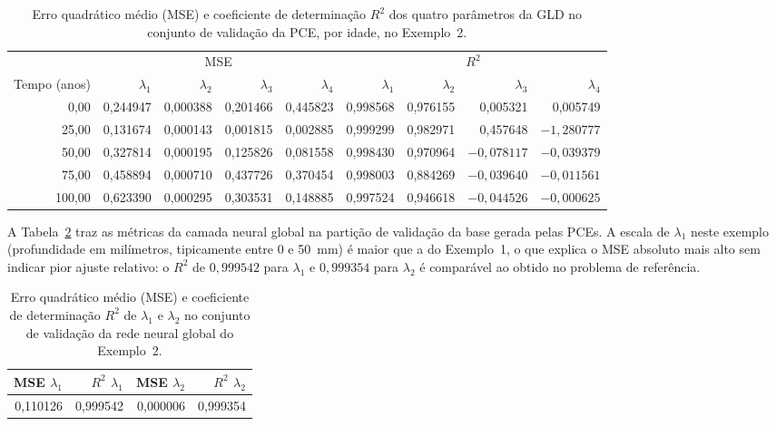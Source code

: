 \begin{table}[H]
\centering
\caption{Erro quadrático médio (MSE) e coeficiente de determinação $R^2$ dos quatro parâmetros da GLD no conjunto de validação da PCE, por idade, no Exemplo~2.}
\label{tab:validation_results_ex2}
\footnotesize
\setlength{\tabcolsep}{4pt}
\begin{tabular}{rrrrrrrrr}
\toprule
 & \multicolumn{4}{c}{MSE} & \multicolumn{4}{c}{$R^2$} \\
\cmidrule(lr){2-5}\cmidrule(lr){6-9}
Tempo (anos) & $\lambda_1$ & $\lambda_2$ & $\lambda_3$ & $\lambda_4$ & $\lambda_1$ & $\lambda_2$ & $\lambda_3$ & $\lambda_4$ \\
\midrule
0,00   & 0,244947 & 0,000388 & 0,201466 & 0,445823 & 0,998568 & 0,976155 & 0,005321      & 0,005749 \\
25,00  & 0,131674 & 0,000143 & 0,001815 & 0,002885 & 0,999299 & 0,982971 & 0,457648      & $-1{,}280777$ \\
50,00  & 0,327814 & 0,000195 & 0,125826 & 0,081558 & 0,998430 & 0,970964 & $-0{,}078117$ & $-0{,}039379$ \\
75,00  & 0,458894 & 0,000710 & 0,437726 & 0,370454 & 0,998003 & 0,884269 & $-0{,}039640$ & $-0{,}011561$ \\
100,00 & 0,623390 & 0,000295 & 0,303531 & 0,148885 & 0,997524 & 0,946618 & $-0{,}044526$ & $-0{,}000625$ \\
\bottomrule
\end{tabular}
\end{table}

A Tabela~\ref{tab:nn_validation_ex2} traz as métricas da camada neural global na partição de validação da base gerada pelas PCEs. A escala de $\lambda_1$ neste exemplo (profundidade em milímetros, tipicamente entre 0 e 50~mm) é maior que a do Exemplo~1, o que explica o MSE absoluto mais alto sem indicar pior ajuste relativo: o $R^2$ de $0{,}999542$ para $\lambda_1$ e $0{,}999354$ para $\lambda_2$ é comparável ao obtido no problema de referência.

\begin{table}[H]
\centering
\caption{Erro quadrático médio (MSE) e coeficiente de determinação $R^2$ de $\lambda_1$ e $\lambda_2$ no conjunto de validação da rede neural global do Exemplo~2.}
\label{tab:nn_validation_ex2}
\begin{tabular}{rrrr}
\toprule
MSE $\lambda_1$ & $R^2$ $\lambda_1$ & MSE $\lambda_2$ & $R^2$ $\lambda_2$ \\
\midrule
0,110126 & 0,999542 & 0,000006 & 0,999354 \\
\bottomrule
\end{tabular}
\end{table}

